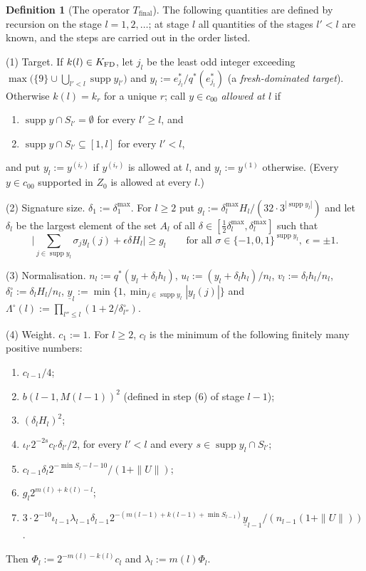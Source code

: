 \documentclass[10pt]{amsart}
\theoremstyle{definition}
\newtheorem{definition}[theorem]{Definition}
\theoremstyle{remark}
\newcommand{\supp}{\operatorname{supp}}
\begin{document}
\begin{definition}[The operator $T_{\mathrm{final}}$]\label{def:II-Tfinal}
The following quantities are defined by recursion on the stage
$l=1,2,\dots$; at stage $l$ all quantities of the stages $l'<l$ are
known, and the steps are carried out in the order listed.

\smallskip\noindent\textup{(1) Target.}  If $k(l)\in K_{\rm FD}$, let
$j_l$ be the least odd integer exceeding $\max\big(\{9\}\cup
\bigcup_{l'<l}\supp y_{l'}\big)$ and $y_l:=e_{j_l}^*/q^*(e_{j_l}^*)$ (a
\emph{fresh-dominated target}).  Otherwise $k(l)=k_r$ for a unique $r$;
call $y\in c_{00}$ \emph{allowed at $l$} if
\begin{enumerate}
\item[(a)] $\supp y\cap S_{l'}=\emptyset$ for every $l'\ge l$, and
\item[(c)] $\supp y\cap S_{l'}\subseteq[1,l]$ for every $l'<l$,
\end{enumerate}
and put $y_l:=y^{(i_r)}$ if $y^{(i_r)}$ is allowed at $l$, and
$y_l:=y^{(1)}$ otherwise.  (Every $y\in c_{00}$ supported in $Z_0$ is
allowed at every $l$.)

\smallskip\noindent\textup{(2) Signature size.}
$\delta_1:=\delta^{\max}_1$.  For $l\ge2$ put
$g_l:=\delta^{\max}_lH_l/(32\cdot3^{|\supp y_l|})$ and let $\delta_l$ be
the largest element of the set $A_l$ of all
$\delta\in[\frac12\delta^{\max}_l,\delta^{\max}_l]$ such that
\[
 \Big|\sum_{j\in\supp y_l}\sigma_jy_l(j)+\epsilon\delta H_l\Big|\ge g_l
 \qquad\text{for all }\sigma\in\{-1,0,1\}^{\supp y_l},\ \epsilon=\pm1 .
 \tag{GM}
\]

\smallskip\noindent\textup{(3) Normalisation.}
$n_l:=q^*(y_l+\delta_lh_l)$, $u_l:=(y_l+\delta_lh_l)/n_l$,
$v_l:=\delta_lh_l/n_l$, $\delta^\circ_l:=\delta_lH_l/n_l$,
$\underline y_l:=\min\{1,\min_{j\in\supp y_l}|y_l(j)|\}$ and
$\Lambda^\circ(l):=\prod_{l''\le l}(1+2/\delta^\circ_{l''})$.

\smallskip\noindent\textup{(4) Weight.}  $c_1:=1$.  For $l\ge2$, $c_l$ is
the minimum of the following finitely many positive numbers:
\begin{enumerate}
\item[(W1)] $c_{l-1}/4$;
\item[(W2)] $b(l-1,M(l-1))^2$ (defined in step (6) of stage $l-1$);
\item[(W3)] $(\delta_lH_l)^2$;
\item[(W4)] $\iota_{l'}2^{-2s}c_{l'}\delta_{l'}/2$, for every $l'<l$ and
every $s\in\supp y_l\cap S_{l'}$;
\item[(W5)] $c_{l-1}\delta_l2^{-\min S_l-l-10}/(1+\|U\|)$;
\item[(W6)] $g_l2^{m(l)+k(l)-l}$;
\item[(W7)] $3\cdot2^{-10}\iota_{l-1}\lambda_{l-1}\delta_{l-1}
2^{-(m(l-1)+k(l-1)+\min S_{l-1})}\underline y_{l-1}/
(n_{l-1}(1+\|U\|))$.
\end{enumerate}
Then $\Phi_l:=2^{-m(l)-k(l)}c_l$ and $\lambda_l:=m(l)\Phi_l$.


\end{definition}
\end{document}
